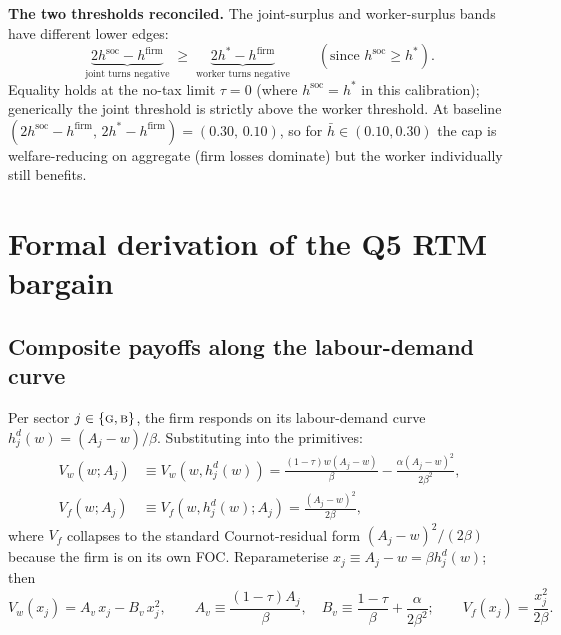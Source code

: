 \documentclass[a4paper,11pt]{article}
\begin{document}
\textbf{The two thresholds reconciled.} The joint-surplus and worker-surplus bands have different lower edges:
\[
\underbrace{2h^{\mathrm{soc}}-h^{\mathrm{firm}}}_{\text{joint turns negative}}
\;\ge\;
\underbrace{2h^{*}-h^{\mathrm{firm}}}_{\text{worker turns negative}}
\qquad(\text{since }h^{\mathrm{soc}}\ge h^{*}).
\]
Equality holds at the no-tax limit $\tau\!=\!0$ (where $h^{\mathrm{soc}}\!=\!h^{*}$ in this calibration); generically the joint threshold is strictly above the worker threshold. At baseline $(2h^{\mathrm{soc}}-h^{\mathrm{firm}},\,2h^{*}-h^{\mathrm{firm}})=(0.30,\,0.10)$, so for $\bar h\in(0.10,0.30)$ the cap is welfare-reducing on aggregate (firm losses dominate) but the worker individually still benefits.

\section{Formal derivation of the Q5 RTM bargain}

\subsection{Composite payoffs along the labour-demand curve}
Per sector $j\in\{\textsc{g},\textsc{b}\}$, the firm responds on its labour-demand curve $h^d_j(w)=(A_j-w)/\beta$. Substituting into the primitives:
\begin{align*}
V_w(w;A_j) &\equiv V_w(w,h^d_j(w))=\frac{(1-\tau)w(A_j-w)}{\beta}-\frac{\alpha(A_j-w)^{2}}{2\beta^{2}},\\
V_f(w;A_j) &\equiv V_f(w,h^d_j(w);A_j)=\frac{(A_j-w)^{2}}{2\beta},
\end{align*}
where $V_f$ collapses to the standard Cournot-residual form $(A_j-w)^{2}/(2\beta)$ because the firm is on its own FOC. Reparameterise $x_j\equiv A_j-w=\beta h^d_j(w)$; then
\begin{equation}
V_w(x_j)=A_v\,x_j-B_v\,x_j^{2},\qquad A_v\equiv\frac{(1-\tau)A_j}{\beta},\quad B_v\equiv\frac{1-\tau}{\beta}+\frac{\alpha}{2\beta^{2}};\qquad V_f(x_j)=\frac{x_j^{2}}{2\beta}.
\label{eq:rtm-composite}
\end{equation}
\end{document}

